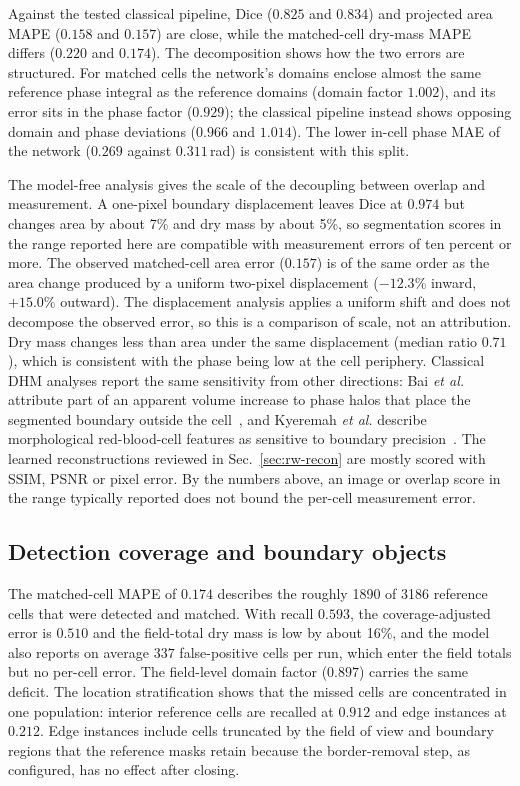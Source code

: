 \documentclass[11pt]{article}
\begin{document}
Against the tested classical pipeline, Dice ($0.825$ and $0.834$) and projected
area MAPE ($0.158$ and $0.157$) are close, while the matched-cell dry-mass MAPE
differs ($0.220$ and $0.174$). The decomposition shows how the two errors are
structured. For matched cells the network's domains enclose almost the same
reference phase integral as the reference domains (domain factor $1.002$), and
its error sits in the phase factor ($0.929$); the classical pipeline instead
shows opposing domain and phase deviations ($0.966$ and $1.014$). The lower
in-cell phase MAE of the network ($0.269$ against $0.311$\,rad) is consistent
with this split.

The model-free analysis gives the scale of the decoupling between overlap and
measurement. A one-pixel boundary displacement leaves Dice at $0.974$ but
changes area by about 7\% and dry mass by about 5\%, so segmentation scores in
the range reported here are compatible with measurement errors of ten percent
or more. The observed matched-cell area error ($0.157$) is of the same order as
the area change produced by a uniform two-pixel displacement ($-12.3\%$
inward, $+15.0\%$ outward). The displacement analysis applies a uniform shift
and does not decompose the observed error, so this is a comparison of scale,
not an attribution. Dry mass changes less than area under the same
displacement (median ratio $0.71$), which is consistent with the phase being
low at the cell periphery. Classical DHM analyses report the same sensitivity
from other directions: Bai \emph{et al.} attribute part of an apparent volume
increase to phase halos that place the segmented boundary outside the
cell~\cite{bai2026macrophage}, and Kyeremah \emph{et al.} describe
morphological red-blood-cell features as sensitive to boundary
precision~\cite{kyeremah2025malaria}. The learned reconstructions reviewed in
Sec.~\ref{sec:rw-recon} are mostly scored with SSIM, PSNR or pixel error. By
the numbers above, an image or overlap score in the range typically reported
does not bound the per-cell measurement error.

\subsection{Detection coverage and boundary objects}
\label{sec:disc-coverage}

The matched-cell MAPE of $0.174$ describes the roughly 1890 of 3186 reference
cells that were detected and matched. With recall $0.593$, the
coverage-adjusted error is $0.510$ and the field-total dry mass is low by about
16\%, and the model also reports on average $337$ false-positive cells per run,
which enter the field totals but no per-cell error. The field-level domain
factor ($0.897$) carries the same deficit. The location stratification shows
that the missed cells are concentrated in one population: interior reference
cells are recalled at $0.912$ and edge instances at $0.212$. Edge instances
include cells truncated by the field of view and boundary regions that the
reference masks retain because the border-removal step, as configured, has no
effect after closing.
\end{document}

